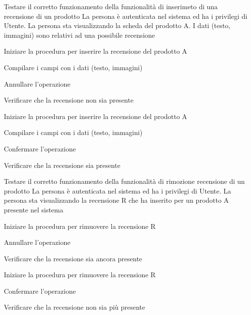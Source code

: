 
{Testare il corretto funzionamento della funzionalità di inserimeto di una recensione di un prodotto}
{La persona è autenticata nel sistema ed ha i privilegi di Utente. La persona sta visualizzando la scheda del prodotto A. I dati (testo, immagini) sono relativi ad una possibile recensione}
{\begin{enumCU}
	\item Iniziare la procedura per inserire la recensione del prodotto A
	\item Compilare i campi con i dati (testo, immagini)
	\item Annullare l'operazione
	\item Verificare che la recensione non sia presente
	\item Iniziare la procedura per inserire la recensione del prodotto A
	\item Compilare i campi con i dati (testo, immagini)
	\item Confermare l'operazione
	\item Verificare che la recensione sia presente
\end{enumCU}}


{Testare il corretto funzionamento della funzionalità di rimozione recensione di un prodotto}
{La persona è autenticata nel sistema ed ha i privilegi di Utente. La persona sta visualizzando la recensione R che ha inserito per un prodotto A presente nel sistema}
{\begin{enumCU}
	\item Iniziare la procedura per rimuovere la recensione R
	\item Annullare l'operazione
	\item Verificare che la recensione sia ancora presente
	\item Iniziare la procedura per rimuovere la recensione R
	\item Confermare l'operazione
	\item Verificare che la recensione non sia più presente
\end{enumCU}}


